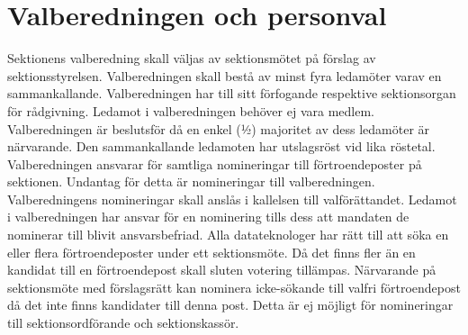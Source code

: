 \documentclass[a4paper]{dteklag}
\begin{document}
\section{Valberedningen och personval}
\para[Valberedningen] Sektionens valberedning skall väljas av sektionsmötet på förslag av sektionsstyrelsen.
\para Valberedningen skall bestå av minst fyra ledamöter varav en sammankallande.
\para Valberedningen har till sitt förfogande respektive sektionsorgan för rådgivning.
\para Ledamot i valberedningen behöver ej vara medlem.
\para Valberedningen är beslutsför då en enkel (1⁄2) majoritet av dess ledamöter är närvarande.
\para Den sammankallande ledamoten har utslagsröst vid lika röstetal.
\para Valberedningen ansvarar för samtliga nomineringar till förtroendeposter på sektionen.
\stycke Undantag för detta är nomineringar till valberedningen.
\para Valberedningens nomineringar skall anslås i kallelsen till valförättandet.
\para Ledamot i valberedningen har ansvar för en nominering tills dess att mandaten de nominerar till blivit ansvarsbefriad.
\para [Inval] Alla datateknologer har rätt till att söka en eller flera förtroendeposter under ett sektionsmöte.
\para Då det finns fler än en kandidat till en förtroendepost skall sluten votering tillämpas.
 Närvarande på sektionsmöte med förslagsrätt kan nominera icke-sökande till valfri förtroendepost då det inte finns kandidater till denna post.
\stycke Detta är ej möjligt för nomineringar till sektionsordförande och sektionskassör.

\end{document}
